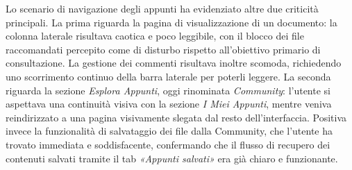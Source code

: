 Lo scenario di navigazione degli appunti ha evidenziato altre due criticità principali. La prima riguarda la pagina di visualizzazione di un documento: la colonna laterale risultava caotica e poco leggibile, con il blocco dei file raccomandati percepito come di disturbo rispetto all'obiettivo primario di consultazione. La gestione dei commenti risultava inoltre scomoda, richiedendo uno scorrimento continuo della barra laterale per poterli leggere. 
La seconda riguarda la sezione \textit{Esplora Appunti}, oggi rinominata \textit{Community}: l'utente si aspettava una continuità visiva con la sezione \textit{I Miei Appunti}, mentre veniva reindirizzato a una pagina visivamente slegata dal resto dell'interfaccia. Positiva invece la funzionalità di salvataggio dei file dalla Community, che l'utente ha trovato immediata e soddisfacente, confermando che il flusso di recupero dei contenuti salvati tramite il tab \textit{«Appunti salvati»} era già chiaro e funzionante.

